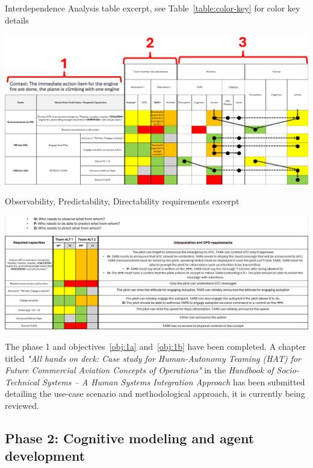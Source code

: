 \documentclass[12pt,a4paper]{article} %
\begin{document}
	\begin{table}[H]
		\centering
		\caption{Interdependence Analysis table excerpt, see Table~\ref{table:color-key} for color key details}
		\includegraphics[width=1\textwidth]{images/IA-table.png}
		\label{table:IA}
	\end{table}

	\begin{table}[H]
		\centering
		\caption{Observability, Predictability, Directability requirements excerpt}
		\includegraphics[width=1\textwidth]{images/OPD_table.png}
		\label{table:OPD}
	\end{table}

	The phase 1 and objectives~\ref{obj:1a} and~\ref{obj:1b} have been completed. A chapter titled \textit{"All hands on deck: Case study for Human-Autonomy Teaming (HAT) for Future Commercial Aviation Concepts of Operations"} in the \textit{Handbook of Socio-Technical Systems -- A Human Systems Integration Approach} has been submitted detailing the use-case scenario and methodological approach, it is currently being reviewed.

	\subsection{Phase 2: Cognitive modeling and agent development}
\end{document}
